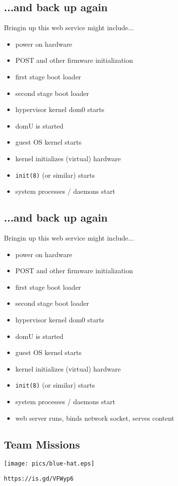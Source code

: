 \documentclass[xga]{xdvislides}
\begin{document}
\subsection{...and back up again}
Bringin up this web service might include...
\\

\begin{itemize}
	\item power on hardware
	\item POST and other firmware initialization
	\item first stage boot loader
	\item second stage boot loader
	\item hypervisor kernel dom0 starts
	\item domU is started
	\item guest OS kernel starts
	\item kernel initializes (virtual) hardware
	\item {\tt init(8)} (or similar) starts
	\item system processes / daemons start
\end{itemize}

\subsection{...and back up again}
Bringin up this web service might include...
\\

\begin{itemize}
	\item power on hardware
	\item POST and other firmware initialization
	\item first stage boot loader
	\item second stage boot loader
	\item hypervisor kernel dom0 starts
	\item domU is started
	\item guest OS kernel starts
	\item kernel initializes (virtual) hardware
	\item {\tt init(8)} (or similar) starts
	\item system processes / daemons start
	\item web server runs, binds network socket, serves content
\end{itemize}


\subsection{Team Missions}
\vspace*{\fill}
\begin{center}
\texttt{[image: pics/blue-hat.eps]}
\end{center}
{\tt https://is.gd/VFWyp6}
\vspace*{\fill}
\end{document}
